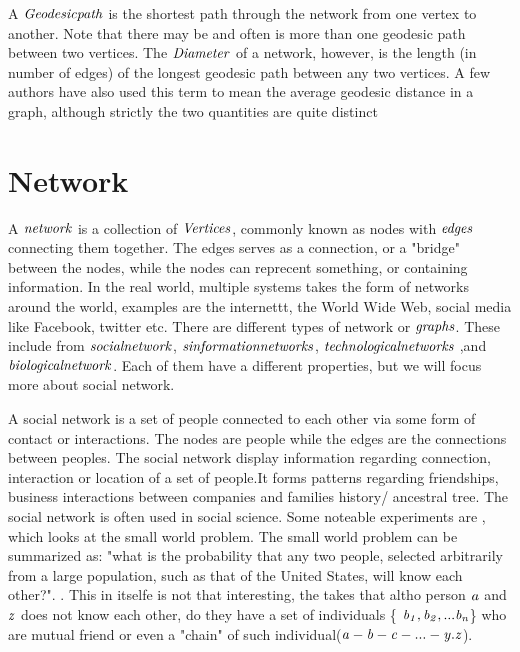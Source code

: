 A $\it{{Geodesic path}}$ is the shortest path through the network from one vertex to another. Note that there may be and often is more than one geodesic path between two vertices. The $\it{{Diameter}}$ of a network, however,  is the length (in number of edges) of the longest geodesic path between any two vertices. A few authors have also used this term to mean the average geodesic distance in a graph, although strictly the two quantities are quite distinct

\section{Network}
A $\it{network}$ is a collection of $\it{Vertices}$, commonly known as nodes with $\it{edges}$ connecting them together\cite{ComplexNetwork2003}. The edges serves as a connection, or a "bridge" between the nodes, while the nodes can reprecent something, or containing information. In the real world, multiple systems takes the form of networks around the world, examples are the internettt, the World Wide Web, social media like Facebook, twitter etc.  There are different types of network or $\it{graphs}$. These include from $\it{social network}$, $\it {sinformation networks}$, $\it{technological networks}$ ,and $\it{biological network}$.  Each of them have a different properties, but we will focus more about social network.

A social network is a set of people connected to each other via some form of contact or interactions\cite{ComplexNetwork2003}. The nodes are people while the edges are the connections between peoples. The social network display information regarding connection, interaction or location of a set of people.It forms patterns regarding friendships, business interactions between companies and families history/ ancestral tree. The social network is often used in social science\cite{ComplexNetwork2003}. Some noteable experiments are \cite{smallWorldExperiment}, which looks at the small world problem. The small world problem can be summarized as: "what is the probability that any two people, selected arbitrarily from a large population, such as that of the United States, will know each other?". \cite{smallworldExperiment1969}. This in itselfe is not that interesting, the \cite{SmallworldExperiment1969} takes that altho person $\it{a}$ and $\it{z}$ does not know each other, do they have a set of individuals \{ $\it {b_1, b_2, ... b_n} $\} who are mutual friend or even a "chain" of such individual($\it {a-b-c-...-y.z}$).

